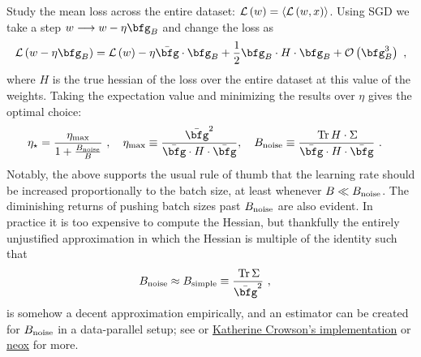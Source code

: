 \documentclass[11pt]{article}
\begin{document}
Study the mean loss across the entire dataset: $ \mathcal{L} \left ( w \right ) = \langle
\mathcal{L} \left ( w, x \right) \rangle$. Using SGD we take a step $ w \longrightarrow w -\eta \bfg _{ B }   $
and change the loss as
\begin{align}
    \Lcal \left ( w -\eta \bfg _{ B } \right )  = \Lcal \left ( w  \right ) -\eta \bar{\bfg }\cdot
    \bfg _{ B } + \frac{ 1 }{ 2 } \bfg _{ B }\cdot  H \cdot  \bfg _{ B } + \Ocal \left( \bfg _{ B }
    ^{ 3 } \right)\ ,
\end{align}
where $ H $ is the true hessian of the loss over the entire dataset at this value of the weights.
Taking the expectation value and minimizing the results  over $ \eta  $ gives the optimal choice:
\begin{align}
    \eta _{ \star } &= \frac{ \eta _{ {\rm  max} } }{ 1 + \frac{ B _{ {\rm  noise} } }{ B } }\ , \quad  \eta _{ {\rm  max} }\equiv \frac{ \bar{\bfg } ^{ 2 } }{ \bar{\bfg }\cdot  H \cdot  \bar{\bfg } } , \quad  B _{ {\rm  noise} } \equiv \frac{ \Tr H \cdot \Sigma  }{  \bar{\bfg }\cdot  H \cdot  \bar{\bfg }}\ .
\end{align}
Notably, the above supports the usual rule of thumb that the learning rate should be increased
proportionally to the batch size, at least whenever $ B \ll B _{ {\rm  noise} } $. The diminishing
returns of pushing batch sizes past $ B _{ {\rm noise} } $ are also evident. In practice it is too
expensive to compute the Hessian, but thankfully the entirely unjustified approximation in which the
Hessian is multiple of the identity such that
\begin{align}
    B _{ {\rm noise} } &\approx B _{ {\rm  simple} } \equiv \frac{ \Tr \Sigma  }{ \bar{\bfg } ^{ 2 } }\ ,
\end{align}
is somehow a decent approximation empirically, and an estimator can be created for $ B _{ {\rm noise} } $
in a data-parallel setup; see \cite{mccandlish2018empirical} or
\href{https://github.com/crowsonkb/k-diffusion/blob/ab527a9a6d347f364e3d185ba6d714e22d80cb3c/k_diffusion/gns.py#L1}{Katherine
Crowson's implementation} or \href{https://github.com/EleutherAI/gpt-neox/blob/408e29d9c746a02d842917bb7447c5c4be0b42d4/megatron/gradient_noise_scale/gradient_noise_scale.py#L1}{neox} for more.
\end{document}
